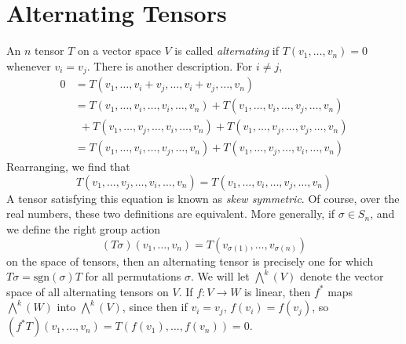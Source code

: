 \section{Alternating Tensors}

An $n$ tensor $T$ on a vector space $V$ is called \emph{alternating} if $T(v_1, \dots, v_n) = 0$ whenever $v_i = v_j$. There is another description. For $i \neq j$,
%
\begin{align*}
    0 &= T(v_1, \dots, v_i + v_j, \dots, v_i + v_j, \dots, v_n)\\
    &= T(v_1, \dots, v_i, \dots, v_i, \dots, v_n) + T(v_1, \dots, v_i, \dots, v_j, \dots, v_n)\\
    &\ \ + T(v_1, \dots, v_j, \dots, v_i, \dots, v_n) + T(v_1, \dots, v_j, \dots, v_j, \dots, v_n)\\
    &= T(v_1, \dots, v_i, \dots, v_j, \dots, v_n) + T(v_1, \dots, v_j, \dots, v_i, \dots, v_n)
\end{align*}
%
Rearranging, we find that
%
\[ T(v_1, \dots, v_j, \dots, v_i, \dots, v_n) = T(v_1, \dots, v_i, \dots, v_j, \dots, v_n) \]
%
A tensor satisfying this equation is known as {\it skew symmetric}. Of course, over the real numbers, these two definitions are equivalent. More generally, if $\sigma \in S_n$, and we define the right group action
%
\[ (T \sigma)(v_1, \dots, v_n) = T(v_{\sigma(1)}, \dots, v_{\sigma(n)}) \]
%
on the space of tensors, then an alternating tensor is precisely one for which $T \sigma = \text{sgn}(\sigma) T$ for all permutations $\sigma$. We will let $\bigwedge^k(V)$ denote the vector space of all alternating tensors on $V$. If $f: V \to W$ is linear, then $f^*$ maps $\bigwedge^k(W)$ into $\bigwedge^k(V)$, since then if $v_i = v_j$, $f(v_i) = f(v_j)$, so $(f^* T)(v_1, \dots, v_n) = T(f(v_1), \dots, f(v_n)) = 0$.


